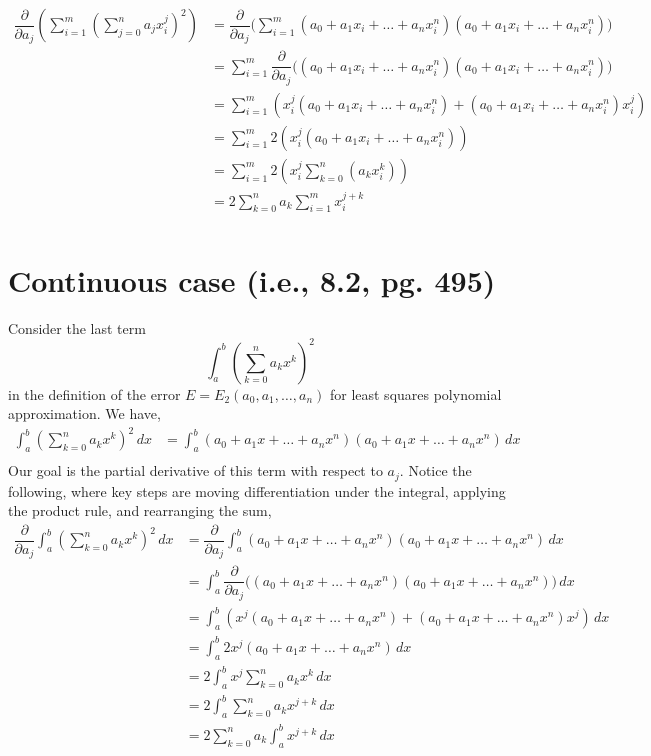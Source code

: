 \documentclass{article}
\begin{document}
\begin{align*}
\dfrac{\partial}{\partial a_j} \left(\sum_{i=1}^m \left(\sum_{j=0}^n a_j x_i^j\right)^2 \right) & =  \dfrac{\partial}{\partial a_j}\Big(\sum_{i=1}^m (a_0 + a_1x_i + \dots + a_n x_i^n)(a_0 + a_1x_i + \dots + a_n x_i^n)\Big)\\
& =  \sum_{i=1}^m \dfrac{\partial}{\partial a_j}\Big((a_0 + a_1x_i + \dots + a_n x_i^n)(a_0 + a_1x_i + \dots + a_n x_i^n)\Big)\\
& = \sum_{i=1}^m   \left(x_i^j(a_0 + a_1x_i + \dots + a_n x_i^n) + (a_0 + a_1x_i + \dots + a_n x_i^n) x_i^j\right)\\
& = \sum_{i=1}^m   2\left(x_i^j(a_0 + a_1x_i + \dots + a_n x_i^n)\right)\\
& = \sum_{i=1}^m   2\left(x_i^j\sum_{k=0}^n(a_kx_i^k)\right)\\
& =   2\sum_{k=0}^n a_k \sum_{i=1}^m x_i^{j+k}\\
\end{align*}

\newpage

\section*{Continuous case (i.e., 8.2, pg. 495)}
Consider the last term \[\int_a^b \left(\sum_{k=0}^n a_k x^k\right)^2\] in the definition of the error \(E = E_2(a_0, a_1, \dots, a_n)\) for least squares polynomial approximation. We have,
\begin{align*}
\int_a^b \left(\sum_{k=0}^n a_k x^k\right)^2\,dx %
& = \int_a^b  (a_0 + a_1x + \dots + a_n x^n)(a_0 + a_1x + \dots + a_n x^n)\,dx\\
\end{align*}
Our goal is the partial derivative of this term with respect to \(a_j\). Notice the following, where key steps are moving differentiation under the integral, applying the product rule, and rearranging the sum,
\begin{align*}
\dfrac{\partial}{\partial a_j}\int_a^b \left(\sum_{k=0}^n a_k x^k\right)^2\,dx & = \dfrac{\partial}{\partial a_j} \int_a^b  (a_0 + a_1x + \dots + a_n x^n)(a_0 + a_1x + \dots + a_n x^n)\,dx\\
& = \int_a^b  \dfrac{\partial}{\partial a_j} \Big((a_0 + a_1x + \dots + a_n x^n)(a_0 + a_1x + \dots + a_n x^n)\Big)\,dx\\
& = \int_a^b   \left(x^j(a_0 + a_1x + \dots + a_n x^n) + (a_0 + a_1x + \dots + a_n x^n) x^j\right)\,dx\\
& = \int_a^b   2x^j(a_0 + a_1x + \dots + a_n x^n)\,dx\\
& = 2\int_a^b   x^j\sum_{k=0}^n a_k x^k\,dx\\
& = 2\int_a^b   \sum_{k=0}^n a_k x^{j+k}\,dx\\
& = 2\sum_{k=0}^n a_k \int_a^b  x^{j+k}\,dx
\end{align*}
\end{document}
